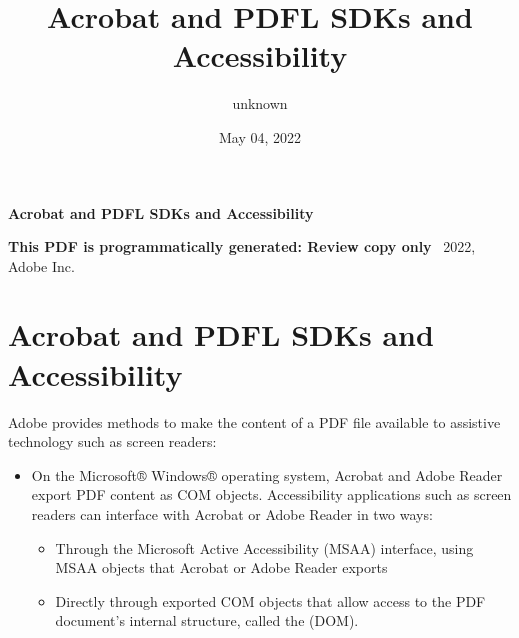 \documentclass[letterpaper,12pt,english,openany,oneside]{sphinxmanual}
\title{Acrobat and PDFL SDKs and Accessibility}
\date{May 04, 2022}
\author{unknown}
\begin{document}
\pagestyle{empty}

    \begin{titlepage}
        \begin{figure}[h]
        \end{figure}
        \centering
        \vspace*{40mm}
        \textbf{\Huge Acrobat and PDFL SDKs and Accessibility}

        \vspace{15mm}
        \Large \textbf{{This PDF is programmatically generated: Review copy only}}
        \vfill
        \small \textcopyright\ 2022, Adobe Inc.
    \end{titlepage}
    \clearpage
    \tableofcontents
    \clearpage
    
\pagestyle{plain}

\pagestyle{normal}
\label{\detokenize{toc::doc}}



\chapter{Acrobat and PDFL SDKs and Accessibility}
\label{\detokenize{index:acrobat-and-pdfl-sdks-and-accessibility}}\label{\detokenize{index::doc}}
Adobe provides methods to make the content of a PDF file available to assistive technology such as screen readers:
\begin{itemize}
\item {} 
On the Microsoft® Windows® operating system, Acrobat and Adobe Reader export PDF content as COM objects. Accessibility applications such as screen readers can interface with Acrobat or Adobe Reader in two ways:
\begin{itemize}
\item {} 
Through the Microsoft Active Accessibility (MSAA) interface, using MSAA objects that Acrobat or Adobe Reader exports

\item {} 
Directly through exported COM objects that allow access to the PDF document’s internal structure, called the  (DOM).

\end{itemize}

\end{itemize}
\end{document}
